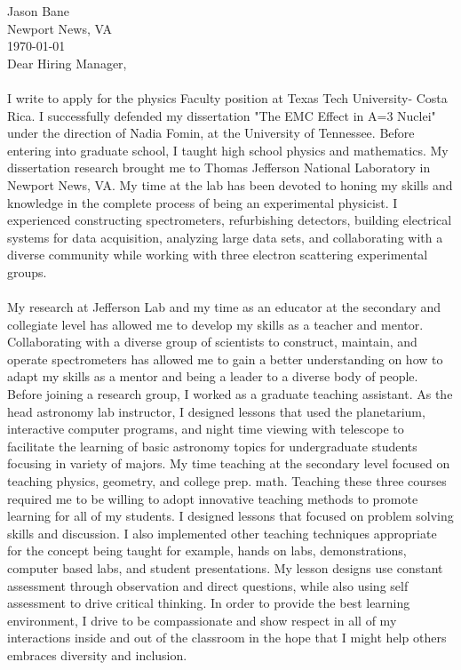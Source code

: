 \documentclass[12pt,letterpaper]{article}
\begin{document}
\vspace*{-1.2cm}
\noindent Jason Bane\\
Newport News, VA \\
\today\\

Dear Hiring Manager,

\paragraph{}I write to apply for the physics Faculty position at Texas Tech University- Costa Rica. I successfully defended my dissertation "The EMC Effect in A=3 Nuclei" under the direction of Nadia Fomin, at the University of Tennessee. Before entering into graduate school, I taught high school physics and mathematics. My dissertation research brought me to Thomas Jefferson National Laboratory in Newport News, VA. My time at the lab has been devoted to honing my skills and knowledge in the complete process of being an experimental physicist. I experienced constructing spectrometers, refurbishing detectors, building electrical systems for data acquisition, analyzing large data sets, and collaborating with a diverse community while working with three electron scattering experimental groups.
\paragraph{}My research at Jefferson Lab and my time as an educator at the secondary and collegiate level has allowed me to develop my skills as a teacher and mentor. Collaborating with a diverse group of scientists to construct, maintain, and operate spectrometers has allowed me to gain a better understanding on how to adapt my skills as a mentor and being a leader to a diverse body of people. Before joining a research group, I worked as a graduate teaching assistant. As the head astronomy lab instructor, I designed lessons that used the planetarium, interactive computer programs, and night time viewing with telescope to facilitate the learning of basic astronomy topics for undergraduate students focusing in variety of majors. My time teaching at the secondary level focused on teaching physics, geometry, and  college prep. math. Teaching these three courses required me to be willing to adopt innovative teaching methods to promote learning for all of my students. I designed lessons that focused on problem solving skills and discussion. I also implemented other teaching techniques appropriate for the concept being taught for example, hands on labs, demonstrations, computer based labs, and student presentations. My lesson designs use constant assessment through observation and direct questions, while also using self assessment to drive critical thinking. In order to provide the best learning environment, I drive to be compassionate and show respect in all of my interactions inside and out of the classroom in the hope that I might help others embraces diversity and inclusion. 
\end{document}
